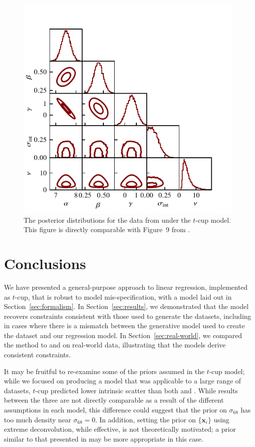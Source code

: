 \documentclass[fleqn,usenatbib]{rasti}
\begin{document}
\begin{figure}
    \includegraphics[width=\columnwidth]{graphics/real/corner_park_fwhm.pdf}
    \caption{The posterior distributions for the data from \citet{Park:2017}
    under the $t$-cup model. This figure is directly comparable with Figure~9
    from \citet{Park:2017}.}
    \label{fig:real-world.park.corner}
\end{figure}

\section{Conclusions}
\label{sec:conclusion}

We have presented a general-purpose approach to linear regression, implemented
as $t$-cup, that is robust to model mis-specification, with a model laid out in
Section~\ref{sec:formalism}. In Section~\ref{sec:results}, we demonstrated that
the model recovers constraints consistent with those used to generate the
datasets, including in cases where there is a mismatch between the generative
model used to create the dataset and our regression model. In
Section~\ref{sec:real-world}, we compared the method to \citet{Kelly:2007} and
\citet{Park:2017} on real-world data, illustrating that the models derive
consistent constraints.

It may be fruitful to re-examine some of the priors assumed in the $t$-cup
model; while we focused on producing a model that was applicable to a large
range of datasets, $t$-cup predicted lower intrinsic scatter than both
\citet{Kelly:2007} and \citet{Park:2017}. While results between the three are
not directly comparable as a result of the different assumptions in each model,
this difference could suggest that the prior on $\sigma_{68}$ has too much
density near $\sigma_{68} = 0$. In addition, setting the prior on
$\{\mathbf{x}_i\}$ using extreme deconvolution, while effective, is not
theoretically motivated; a prior similar to that presented in
\citet{Bartlett:2023} may be more appropriate in this case.
\end{document}
